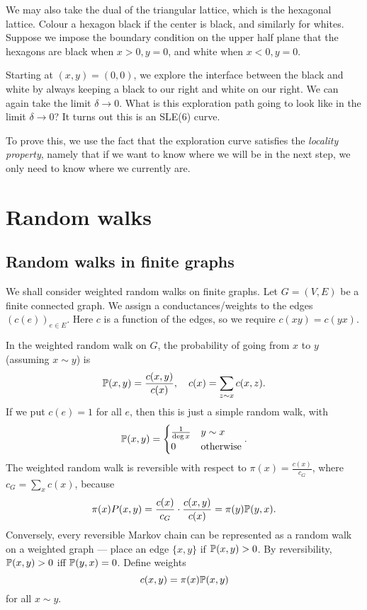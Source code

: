 \documentclass[a4paper]{article}
\begin{document}
We may also take the dual of the triangular lattice, which is the hexagonal lattice. Colour a hexagon black if the center is black, and similarly for whites. Suppose we impose the boundary condition on the upper half plane that the hexagons are black when $x > 0, y = 0$, and white when $x < 0, y = 0$.

Starting at $(x, y) = (0, 0)$, we explore the interface between the black and white by always keeping a black to our right and white on our right. We can again take the limit $\delta \to 0$. What is this exploration path going to look like in the limit $\delta \to 0$? It turns out this is an SLE(6) curve.

To prove this, we use the fact that the exploration curve satisfies the \emph{locality property}, namely that if we want to know where we will be in the next step, we only need to know where we currently are.

%
%

\section{Random walks}
\subsection{Random walks in finite graphs}
We shall consider weighted random walks on finite graphs. Let $G = (V, E)$ be a finite connected graph. We assign a conductances/weights to the edges $(c(e))_{e \in E}$. Here $c$ is a function of the edges, so we require $c(xy) = c(yx)$.

In the weighted random walk on $G$, the probability of going from $x$ to $y$ (assuming $x \sim y$) is
\[
  \P(x, y) = \frac{c(x, y)}{ c(x)},\quad c(x) = \sum_{z \sim x} c(x, z).
\]
If we put $c(e) = 1$ for all $e$, then this is just a simple random walk, with
\[
  \P(x, y) =
  \begin{cases}
    \frac{1}{\deg x} & y \sim x\\
    0 & \text{otherwise}
  \end{cases}.
\]
The weighted random walk is reversible with respect to $\pi(x) = \frac{c(x)}{c_G}$, where $c_G = \sum_x c(x)$, because
\[
  \pi(x) P(x, y) = \frac{c(x)}{c_G} \cdot \frac{c(x, y)}{c(x)} = \pi(y) \P(y, x).
\]
Conversely, every reversible Markov chain can be represented as a random walk on a weighted graph --- place an edge $\{x, y\}$ if $\P(x, y) > 0$. By reversibility, $\P(x, y) > 0$ iff $\P(y, x) = 0$. Define weights
\[
  c(x, y) = \pi(x) \P(x, y)
\]
for all $x \sim y$.
\end{document}
